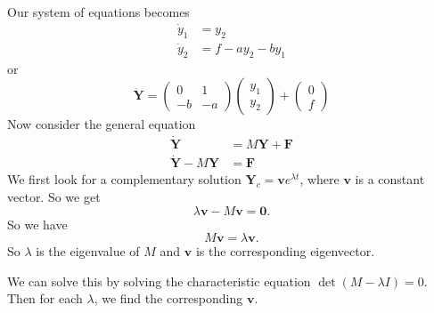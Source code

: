 \documentclass[a4paper]{article}
\theoremstyle{definition}
\newcommand{\mb}[1]{\mathbf{#1}}
\begin{document}
Our system of equations becomes
\begin{align*}
  \dot y_1 &= y_2\\
  \dot y_2 &= f - a y_2 - by_1
\end{align*}
or
\[
\mb{\dot{Y}} = 
\begin{pmatrix}
  0 & 1\\
  -b & -a
\end{pmatrix}
\begin{pmatrix}
  y_1\\y_2
\end{pmatrix} + 
\begin{pmatrix}
  0 \\ f
\end{pmatrix}
\]
Now consider the general equation
\begin{align*}
  \mb{\dot {Y}} &= M\mb{Y} + \mb{F}\\
  \mb{\dot {Y}} - M\mb{Y} &= \mb{F}
\end{align*}
We first look for a complementary solution $\mb{Y}_c = \mb{v} e^{\lambda t}$, where $\mb{v}$ is a constant vector. So we get
\[
\lambda\mb{v} - M\mb{v} = \mb{0}.
\]
So we have
\[
M\mb{v} = \lambda \mb{v}.
\]
So $\lambda$ is the eigenvalue of $M$ and $\mb{v}$ is the corresponding eigenvector.

We can solve this by solving the characteristic equation $\det(M - \lambda I) = 0$. Then for each $\lambda$, we find the corresponding $\mb{v}$.
\end{document}
